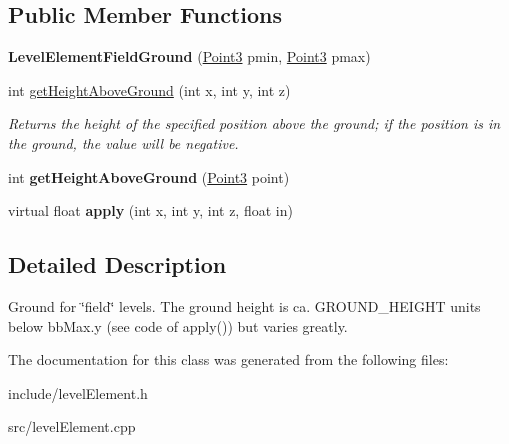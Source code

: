 \subsection*{\-Public \-Member \-Functions}
\begin{DoxyCompactItemize}
\item 
\hypertarget{classLevelElementFieldGround_afdd51af780892990be11c1e57442fe0a}{
{\bfseries \-Level\-Element\-Field\-Ground} (\hyperlink{classPoint3}{\-Point3} pmin, \hyperlink{classPoint3}{\-Point3} pmax)}
\label{dc/dcc/classLevelElementFieldGround_afdd51af780892990be11c1e57442fe0a}

\item 
\hypertarget{classLevelElementFieldGround_ab2b34a9432a155610c2c40bd67a90e63}{
int \hyperlink{classLevelElementFieldGround_ab2b34a9432a155610c2c40bd67a90e63}{get\-Height\-Above\-Ground} (int x, int y, int z)}
\label{dc/dcc/classLevelElementFieldGround_ab2b34a9432a155610c2c40bd67a90e63}

\begin{DoxyCompactList}\small\item\em \-Returns the height of the specified position above the ground; if the position is in the ground, the value will be negative. \end{DoxyCompactList}\item 
\hypertarget{classLevelElementFieldGround_a1f3611cc5b780f63ee3dbfd9544d2c3b}{
int {\bfseries get\-Height\-Above\-Ground} (\hyperlink{classPoint3}{\-Point3} point)}
\label{dc/dcc/classLevelElementFieldGround_a1f3611cc5b780f63ee3dbfd9544d2c3b}

\item 
\hypertarget{classLevelElementFieldGround_ac642e12dadc3dc5d95a01fb3c6228a6e}{
virtual float {\bfseries apply} (int x, int y, int z, float in)}
\label{dc/dcc/classLevelElementFieldGround_ac642e12dadc3dc5d95a01fb3c6228a6e}

\end{DoxyCompactItemize}


\subsection{\-Detailed \-Description}
\-Ground for \char`\"{}field\char`\"{} levels. \-The ground height is ca. \-G\-R\-O\-U\-N\-D\-\_\-\-H\-E\-I\-G\-H\-T units below bb\-Max.\-y (see code of apply()) but varies greatly. 

\-The documentation for this class was generated from the following files\-:\begin{DoxyCompactItemize}
\item 
include/level\-Element.\-h\item 
src/level\-Element.\-cpp\end{DoxyCompactItemize}
